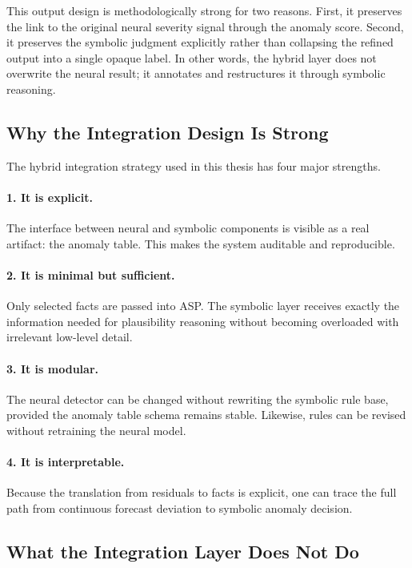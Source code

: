 This output design is methodologically strong for two reasons. First, it preserves the link to the original neural severity signal through the anomaly score. Second, it preserves the symbolic judgment explicitly rather than collapsing the refined output into a single opaque label. In other words, the hybrid layer does not overwrite the neural result; it annotates and restructures it through symbolic reasoning.

\subsection{Why the Integration Design Is Strong}

The hybrid integration strategy used in this thesis has four major strengths.

\paragraph{1. It is explicit.}
The interface between neural and symbolic components is visible as a real artifact: the anomaly table. This makes the system auditable and reproducible.

\paragraph{2. It is minimal but sufficient.}
Only selected facts are passed into ASP. The symbolic layer receives exactly the information needed for plausibility reasoning without becoming overloaded with irrelevant low-level detail.

\paragraph{3. It is modular.}
The neural detector can be changed without rewriting the symbolic rule base, provided the anomaly table schema remains stable. Likewise, rules can be revised without retraining the neural model.

\paragraph{4. It is interpretable.}
Because the translation from residuals to facts is explicit, one can trace the full path from continuous forecast deviation to symbolic anomaly decision.

\subsection{What the Integration Layer Does Not Do}

